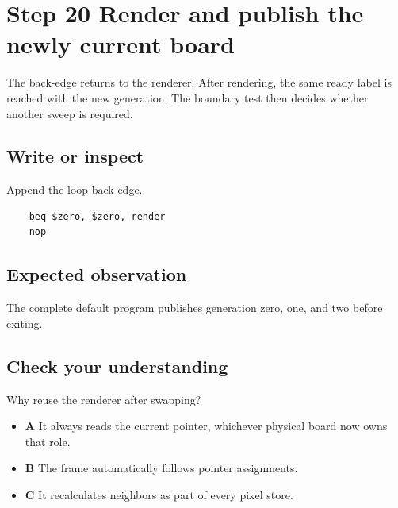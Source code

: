 \section{Step 20 Render and publish the newly current
  board}\label{008-life-generations-s20-step-20-render-and-publish-the-newly-current-board}

The back-edge returns to the renderer. After rendering, the same ready
label is reached with the new generation. The boundary test then decides
whether another sweep is required.

\subsection{Write or
  inspect}\label{008-life-generations-s20-write-or-inspect}

Append the loop back-edge.

\begin{verbatim}
    beq $zero, $zero, render
    nop
\end{verbatim}

\subsection{Expected
  observation}\label{008-life-generations-s20-expected-observation}

The complete default program publishes generation zero, one, and two
before exiting.

\subsection{Check your
  understanding}\label{008-life-generations-s20-check-your-understanding}

Why reuse the renderer after swapping?

\begin{itemize}
  \tightlist
  \item
        \textbf{A} It always reads the current pointer, whichever physical
        board now owns that role.
  \item
        \textbf{B} The frame automatically follows pointer assignments.
  \item
        \textbf{C} It recalculates neighbors as part of every pixel store.
\end{itemize}
